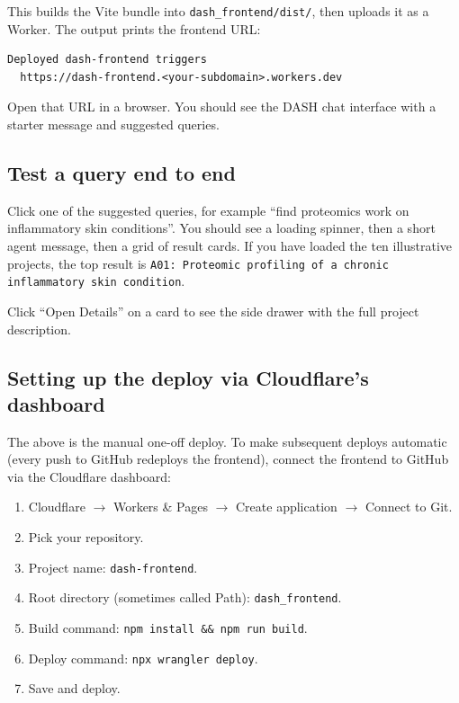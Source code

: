 \documentclass[11pt,a4paper]{article}
\begin{document}
This builds the Vite bundle into \texttt{dash\_frontend/dist/}, then uploads it as a Worker. The output prints the frontend URL:

\begin{lstlisting}[style=shell]
Deployed dash-frontend triggers
  https://dash-frontend.<your-subdomain>.workers.dev
\end{lstlisting}

Open that URL in a browser. You should see the DASH chat interface with a starter message and suggested queries.

\subsection{Test a query end to end}

Click one of the suggested queries, for example ``find proteomics work on inflammatory skin conditions''. You should see a loading spinner, then a short agent message, then a grid of result cards. If you have loaded the ten illustrative projects, the top result is \texttt{A01: Proteomic profiling of a chronic inflammatory skin condition}.

Click ``Open Details'' on a card to see the side drawer with the full project description.

\subsection{Setting up the deploy via Cloudflare's dashboard}

The above is the manual one-off deploy. To make subsequent deploys automatic (every push to GitHub redeploys the frontend), connect the frontend to GitHub via the Cloudflare dashboard:

\begin{enumerate}[leftmargin=1.5em,itemsep=2pt]
  \item Cloudflare \(\rightarrow\) Workers \& Pages \(\rightarrow\) Create application \(\rightarrow\) Connect to Git.
  \item Pick your repository.
  \item Project name: \texttt{dash-frontend}.
  \item Root directory (sometimes called Path): \texttt{dash\_frontend}.
  \item Build command: \texttt{npm install \&\& npm run build}.
  \item Deploy command: \texttt{npx wrangler deploy}.
  \item Save and deploy.
\end{enumerate}
\end{document}

